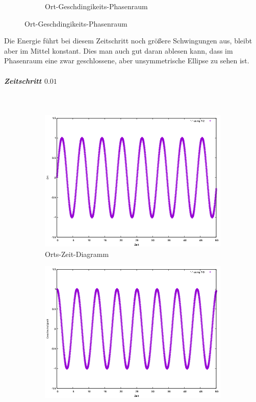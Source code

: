 \documentclass[
    oneside,
    ngerman,
    footinclude=false,
    captions=tableheading,
    DIV=12
]{scrartcl}
\begin{document}
\begin{figure}[H]
\begin{subfigure}[b]{0.45\textwidth}
                    \caption{Ort-Geschdingikeits-Phasenraum}
                    \label{fig:expEulerA1(a)-01-0-xv}
                \end{subfigure}
                \end{figure}
                Die Energie führt bei diesem Zeitschritt noch größere Schwingungen aus, bleibt aber im Mittel konstant. Dies man auch gut daran ablesen kann, dass im Phasenraum eine zwar geschlossene, aber unsymmetrische Ellipse zu sehen ist.

                \subparagraph*{Zeitschritt $0.01$}\,
                \begin{figure}[H]
                    \centering
                    \begin{subfigure}[b]{0.45\textwidth}
                        \centering
                        \includegraphics[width=\textwidth]{Bilddateien/expEulerA1(a)-001h-x.png}
                        \caption{Orts-Zeit-Diagramm}
                        \label{fig:expEulerA1(a)-001-0-x}
                    \end{subfigure}
                    \hfill
                    \begin{subfigure}[b]{0.45\textwidth}
                        \centering
                        \includegraphics[width=\textwidth]{Bilddateien/expEulerA1(a)-001h-v.png}

\end{subfigure}
\end{figure}
\end{document}
